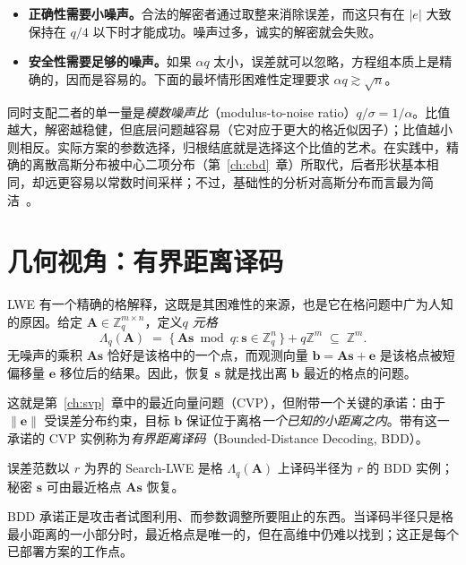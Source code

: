 \begin{itemize}
  \item \textbf{正确性需要小噪声。}合法的解密者通过取整来消除误差，而这只有在 $|e|$ 大致保持在 $q/4$ 以下时才能成功。噪声过多，诚实的解密就会失败。
  \item \textbf{安全性需要足够的噪声。}如果 $\alpha q$ 太小，误差就可以忽略，方程组本质上是精确的，因而是容易的。下面的最坏情形困难性定理要求 $\alpha q \gtrsim \sqrt{n}$。
\end{itemize}

同时支配二者的单一量是\emph{模数噪声比}（modulus-to-noise ratio）$q/\sigma = 1/\alpha$。比值越大，解密越稳健，但底层问题越容易（它对应于更大的格近似因子）；比值越小则相反。实际方案的参数选择，归根结底就是选择这个比值的艺术。在实践中，精确的离散高斯分布被中心二项分布（第~\ref{ch:cbd}~章）所取代，后者形状基本相同，却远更容易以常数时间采样；不过，基础性的分析对高斯分布而言最为简洁~\cite{micciancioregev2007}。

\section{几何视角：有界距离译码}
\label{sec:lwe-bdd}

LWE 有一个精确的格解释，这既是其困难性的来源，也是它在格问题中广为人知的原因。给定 $\mathbf{A}\in\mathbb{Z}_q^{m\times n}$，定义\emph{$q$ 元格}
\[
\Lambda_q(\mathbf{A}) \;=\; \{\, \mathbf{A}\mathbf{s} \bmod q : \mathbf{s}\in\mathbb{Z}_q^{n} \,\} + q\mathbb{Z}^{m} \;\subseteq\; \mathbb{Z}^{m}.
\]
无噪声的乘积 $\mathbf{A}\mathbf{s}$ 恰好是该格中的一个点，而观测向量 $\mathbf{b}=\mathbf{A}\mathbf{s}+\mathbf{e}$ 是该格点被短偏移量 $\mathbf{e}$ 移位后的结果。因此，恢复 $\mathbf{s}$ 就是找出离 $\mathbf{b}$ 最近的格点的问题。

这就是第~\ref{ch:svp}~章中的最近向量问题（CVP），但附带一个关键的承诺：由于 $\|\mathbf{e}\|$ 受误差分布约束，目标 $\mathbf{b}$ 保证位于离格\emph{一个已知的小距离之内}。带有这一承诺的 CVP 实例称为\emph{有界距离译码}（Bounded-Distance Decoding, BDD）。

\begin{proposition}
误差范数以 $r$ 为界的 Search-LWE 是格 $\Lambda_q(\mathbf{A})$ 上译码半径为 $r$ 的 $\mathrm{BDD}$ 实例；秘密 $\mathbf{s}$ 可由最近格点 $\mathbf{A}\mathbf{s}$ 恢复。
\end{proposition}

BDD 承诺正是攻击者试图利用、而参数调整所要阻止的东西。当译码半径只是格最小距离的一小部分时，最近格点是唯一的，但在高维中仍难以找到；这正是每个已部署方案的工作点。

